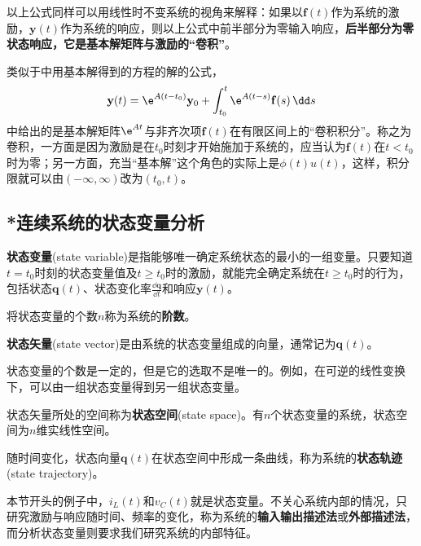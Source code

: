以上公式同样可以用线性时不变系统的视角来解释：如果以$\mathbf{f}(t)$作为系统的激励，$\mathbf{y}(t)$作为系统的响应，则以上公式中前半部分为零输入响应，\textbf{后半部分为零状态响应，它是基本解矩阵与激励的“卷积”}。

类似于中用基本解得到的方程的解的公式，
\begin{equation}
    \mathbf{y}(t)=\e^{A(t-t_0)}\mathbf{y}_0+\int_{t_0}^t \e^{A(t-s)}\mathbf{f}(s)\,\dd s
\end{equation}
中给出的是基本解矩阵$\e^{At}$与非齐次项$\mathbf{f}(t)$在有限区间上的“卷积积分”。称之为卷积，一方面是因为激励是在$t_0$时刻才开始施加于系统的，应当认为$\mathbf{f}(t)$在$t<t_0$时为零；另一方面，充当“基本解”这个角色的实际上是$\phi(t)u(t)$，这样，积分限就可以由$(-\infty,\infty)$改为$(t_0,t)$。

\subsection{*连续系统的状态变量分析}\label{sub:state_variable_analysis}

\begin{definition}[状态变量]
    \textbf{状态变量}(state variable)是指能够唯一确定系统状态的最小的一组变量。只要知道$t=t_0$时刻的状态变量值及$t\geq t_0$时的激励，就能完全确定系统在$t\geq t_0$时的行为，包括状态$\mathbf{q}(t)$、状态变化率$\displaystyle\frac{\dd\mathbf{q}}{\dd t}$和响应$\mathbf{y}(t)$。

    将状态变量的个数$n$称为系统的\textbf{阶数}。
\end{definition}

\begin{definition}[状态矢量]
    \textbf{状态矢量}(state vector)是由系统的状态变量组成的向量，通常记为$\mathbf{q}(t)$。
\end{definition}

状态变量的个数是一定的，但是它的选取不是唯一的。例如，在可逆的线性变换下，可以由一组状态变量得到另一组状态变量。
    
\begin{definition}[状态空间和状态轨迹]
    状态矢量所处的空间称为\textbf{状态空间}(state space)。有$n$个状态变量的系统，状态空间为$n$维实线性空间。
    
    随时间变化，状态向量$\mathbf{q}(t)$在状态空间中形成一条曲线，称为系统的\textbf{状态轨迹}(state trajectory)。
\end{definition}

本节开头的例子中，$i_L(t)$和$v_C(t)$就是状态变量。不关心系统内部的情况，只研究激励与响应随时间、频率的变化，称为系统的\textbf{输入输出描述法}或\textbf{外部描述法}，而分析状态变量则要求我们研究系统的内部特征。

